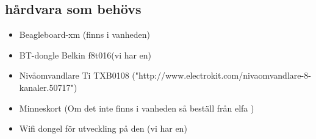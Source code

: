 \subsection{hårdvara som behövs}
\begin{itemize}
\item Beagleboard-xm (finns i vanheden)
\item BT-dongle Belkin f8t016(vi har en)
\item Nivåomvandlare Ti TXB0108 ("http://www.electrokit.com/nivaomvandlare-8-kanaler.50717")
\item Minneskort (Om det inte finns i vanheden så beställ från elfa )
\item Wifi dongel för utveckling på den (vi har en)
\end{itemize}

